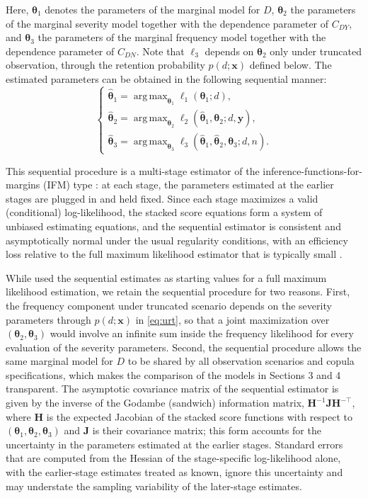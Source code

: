 \documentclass[11pt]{article}
\DeclareMathOperator*{\argmax}{arg\,max}
\begin{document}
{Here, $\boldsymbol{\theta}_1$ denotes the parameters of the marginal model for $D$, $\boldsymbol{\theta}_2$ the parameters of the marginal severity model together with the dependence parameter of $C_{DY}$, and $\boldsymbol{\theta}_3$ the parameters of the marginal frequency model together with the dependence parameter of $C_{DN}$. Note that $\ell_3$ depends on $\boldsymbol{\theta}_2$ only under truncated observation, through the retention probability $p(d;\bm{x})$ defined below.}
The estimated parameters can be obtained in the following sequential manner:
$$
\begin{cases}
\hat{\bm{\theta}}_1 = \argmax_{\boldsymbol{\theta}_1} \ell_1(\boldsymbol{\theta}_1;d)	, \\
\hat{\bm{\theta}}_2 = \argmax_{\boldsymbol{\theta}_2}  \ell_2({\hat{\boldsymbol{\theta}}_1}, \boldsymbol{\theta}_2;d, \boldsymbol{y}) 	, \\
\hat{\bm{\theta}}_3 = \argmax_{\boldsymbol{\theta}_3} \ell_3({\hat{\boldsymbol{\theta}}_1}, {\hat{\boldsymbol{\theta}}_2}, \boldsymbol{\theta}_3;d, n)	.
\end{cases}
$$
{This sequential procedure is a multi-stage estimator of the inference-functions-for-margins (IFM) type \citep{joe1996estimation, zhao2005composite}: at each stage, the parameters estimated at the earlier stages are plugged in and held fixed. Since each stage maximizes a valid (conditional) log-likelihood, the stacked score equations form a system of unbiased estimating equations, and the sequential estimator is consistent and asymptotically normal under the usual regularity conditions, with an efficiency loss relative to the full maximum likelihood estimator that is typically small \citep{zhao2005composite}. 

While \citet{shi2022copula} used the sequential estimates as starting values for a full maximum likelihood estimation, we retain the sequential procedure for two reasons. First, the frequency component under truncated scenario depends on the severity parameters through $p(d;\bm{x})$ in \eqref{eq:urt}, so that a joint maximization over $(\boldsymbol{\theta}_2,\boldsymbol{\theta}_3)$ would involve an infinite sum inside the frequency likelihood for every evaluation of the severity parameters. Second, the sequential procedure allows the same marginal model for $D$ to be shared by all observation scenarios and copula specifications, which makes the comparison of the models in Sections 3 and 4 transparent. The asymptotic covariance matrix of the sequential estimator is given by the inverse of the Godambe (sandwich) information matrix, $\bm{H}^{-1}\bm{J}\bm{H}^{-\top}$, where $\bm{H}$ is the expected Jacobian of the stacked score functions with respect to $(\boldsymbol{\theta}_1,\boldsymbol{\theta}_2,\boldsymbol{\theta}_3)$ and $\bm{J}$ is their covariance matrix; this form accounts for the uncertainty in the parameters estimated at the earlier stages. Standard errors that are computed from the Hessian of the stage-specific log-likelihood alone, with the earlier-stage estimates treated as known, ignore this uncertainty and may understate the sampling variability of the later-stage estimates.}
\end{document}

